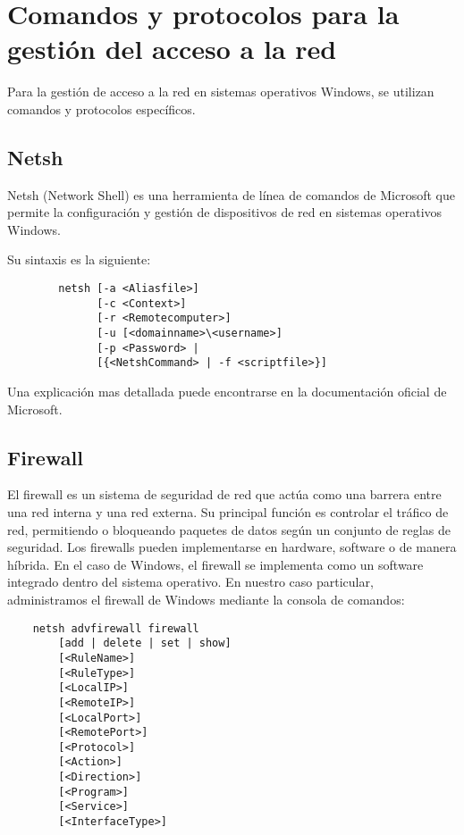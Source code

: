 \section{Comandos y protocolos para la gestión del acceso a la red}
\label{sec:comandos-y-protocolos-para-la-gestion-del-acceso-a-la-red}

Para la gestión de acceso a la red en sistemas operativos Windows, se utilizan comandos y protocolos específicos.

\subsection{Netsh}\label{subsec:netsh}

Netsh (Network Shell) es una herramienta de línea de comandos de Microsoft que permite la configuración y gestión de
dispositivos de red en sistemas operativos Windows.

Su sintaxis es la siguiente:
\begin{center}
	\begin{minipage}{0.7\textwidth}
		\begin{verbatim}
		netsh [-a <Aliasfile>]
			  [-c <Context>]
			  [-r <Remotecomputer>]
			  [-u [<domainname>\<username>]
			  [-p <Password> |
			  [{<NetshCommand> | -f <scriptfile>}]
		\end{verbatim}
	\end{minipage}
\end{center}

Una explicación mas detallada puede encontrarse en la documentación oficial de
Microsoft\cite{microsoftNetsh}.

\subsection{Firewall}\label{subsec:firewall}

El firewall\cite{cloudflareFirewall} es un sistema de seguridad de red que actúa como una barrera entre una red interna y una red externa.
Su principal función es controlar el tráfico de red, permitiendo o bloqueando paquetes de datos según un conjunto
de reglas de seguridad.
Los firewalls pueden implementarse en hardware, software o de manera híbrida.
En el caso de Windows, el firewall se implementa como un software integrado dentro del sistema operativo.
En nuestro caso particular, administramos el firewall de Windows mediante la consola de comandos:

\begin{center}
	\begin{minipage}{0.5\textwidth}
		\begin{verbatim}
	netsh advfirewall firewall
		[add | delete | set | show]
		[<RuleName>]
		[<RuleType>]
		[<LocalIP>]
		[<RemoteIP>]
		[<LocalPort>]
		[<RemotePort>]
		[<Protocol>]
		[<Action>]
		[<Direction>]
		[<Program>]
		[<Service>]
		[<InterfaceType>]
		\end{verbatim}
	\end{minipage}
\end{center}

